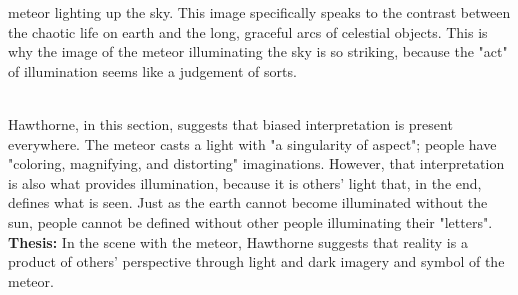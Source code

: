 \documentclass[12pt,a4paper]{article}
\begin{document}
    meteor lighting up the sky. This image specifically speaks to the contrast between
    the chaotic life on earth and the long, graceful arcs of celestial objects. This
    is why the image of the meteor illuminating the sky is so striking, because the
    "act" of illumination seems like a judgement of sorts.
    \\
    \\
    Hawthorne, in this section, suggests that biased interpretation is present everywhere.
    The meteor casts a light with "a singularity of aspect"; people have "coloring,
    magnifying, and distorting" imaginations. However, that interpretation is also
    what provides illumination, because it is others' light that, in the end, defines
    what is seen. Just as the earth cannot become illuminated without the sun, people
    cannot be defined without other people illuminating their "letters".
    \newpage
    \textbf{Thesis:} In the scene with the meteor, Hawthorne suggests that reality
        is a product of others' perspective through light and dark imagery and symbol
        of the meteor.
\end{document}
